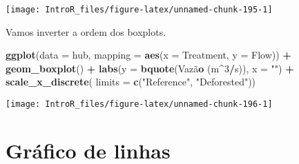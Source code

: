\documentclass[
]{book}
\newenvironment{Shaded}{\begin{snugshade}}{\end{snugshade}}
\newcommand{\DataTypeTok}[1]{\textcolor[rgb]{0.13,0.29,0.53}{#1}}
\newcommand{\DecValTok}[1]{\textcolor[rgb]{0.00,0.00,0.81}{#1}}
\newcommand{\KeywordTok}[1]{\textcolor[rgb]{0.13,0.29,0.53}{\textbf{#1}}}
\newcommand{\NormalTok}[1]{#1}
\newcommand{\OperatorTok}[1]{\textcolor[rgb]{0.81,0.36,0.00}{\textbf{#1}}}
\newcommand{\StringTok}[1]{\textcolor[rgb]{0.31,0.60,0.02}{#1}}
\begin{document}
\begin{center}\texttt{[image: IntroR\_files/figure-latex/unnamed-chunk-195-1]} \end{center}

Vamos inverter a ordem dos boxplots.

\begin{Shaded}
\begin{Highlighting}[]
\KeywordTok{ggplot}\NormalTok{(}\DataTypeTok{data =}\NormalTok{ hub, }\DataTypeTok{mapping =} \KeywordTok{aes}\NormalTok{(}\DataTypeTok{x =}\NormalTok{ Treatment, }\DataTypeTok{y =}\NormalTok{ Flow)) }\OperatorTok{+}
\StringTok{  }\KeywordTok{geom_boxplot}\NormalTok{() }\OperatorTok{+}
\StringTok{  }\KeywordTok{labs}\NormalTok{(}\DataTypeTok{y =} \KeywordTok{bquote}\NormalTok{(Vazã}\KeywordTok{o}\NormalTok{ (m}\OperatorTok{^}\DecValTok{3}\OperatorTok{/}\NormalTok{s)),}
       \DataTypeTok{x =} \StringTok{""}\NormalTok{) }\OperatorTok{+}
\StringTok{  }\KeywordTok{scale_x_discrete}\NormalTok{(}
    \DataTypeTok{limits =} \KeywordTok{c}\NormalTok{(}\StringTok{"Reference"}\NormalTok{, }\StringTok{"Deforested"}\NormalTok{))}
\end{Highlighting}
\end{Shaded}

\begin{center}\texttt{[image: IntroR\_files/figure-latex/unnamed-chunk-196-1]} \end{center}

\hypertarget{gruxe1fico-de-linhas}{%
\section{Gráfico de linhas}\label{gruxe1fico-de-linhas}}

\begin{Shaded}
\end{Shaded}
\end{document}
